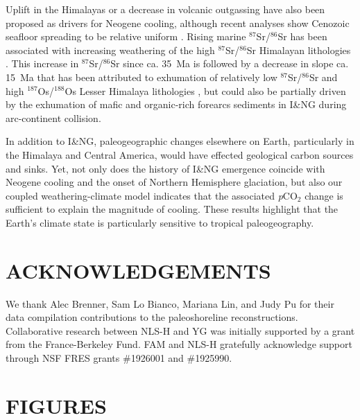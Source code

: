 \documentclass[11pt,letterpaper]{article}
\newcommand{\SrSr}{$^{87}$Sr/$^{86}$Sr\xspace}
\newcommand{\OsOs}{$^{187}$Os/$^{188}$Os\xspace}
\newcommand{\pCOtwo}{\textit{p}CO$_{2}$\xspace}
\begin{document}
Uplift in the Himalayas \cite{Raymo1988a} or a decrease in volcanic outgassing \cite{Berner1983a} have also been proposed as drivers for Neogene cooling, although recent analyses show Cenozoic seafloor spreading to be relative uniform \cite{Rowan2016a}. Rising marine \SrSr has been associated with increasing weathering of the high \SrSr Himalayan lithologies \cite{Raymo1992a}. This increase in \SrSr since ca. 35~Ma is followed by a decrease in slope ca. 15~Ma that has been attributed to exhumation of relatively low \SrSr and high \OsOs Lesser Himalaya lithologies \cite{Myrow2015a, Colleps2018a}, but could also be partially driven by the exhumation of mafic and organic-rich forearcs sediments in I\&NG during arc-continent collision.

In addition to I\&NG, paleogeographic changes elsewhere on Earth, particularly in the Himalaya and Central America, would have effected geological carbon sources and sinks. Yet, not only does the history of I\&NG emergence coincide with Neogene cooling and the onset of Northern Hemisphere glaciation, but also our coupled weathering-climate model indicates that the associated \pCOtwo change is sufficient to explain the magnitude of cooling. These results highlight that the Earth's climate state is particularly sensitive to tropical paleogeography.

\section*{ACKNOWLEDGEMENTS \label{sec:ACKNOWLEDGEMENTS}}

We thank Alec Brenner, Sam Lo Bianco, Mariana Lin, and Judy Pu for their data compilation contributions to the paleoshoreline reconstructions. Collaborative research between NLS-H and YG was initially supported by a grant from the France-Berkeley Fund. FAM and NLS-H gratefully acknowledge support through NSF FRES grants \#1926001 and \#1925990. 

\clearpage
\newpage

\section*{FIGURES}
\end{document}
